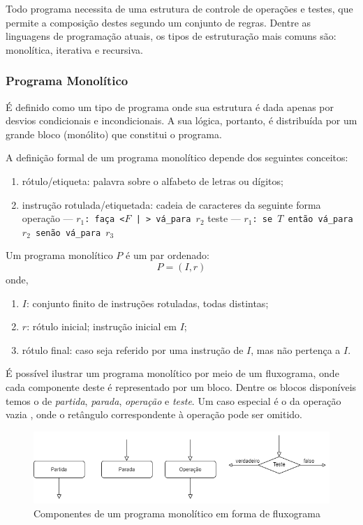 \documentclass[12pt,fleqn]{article}
\begin{document}
Todo programa necessita de uma estrutura de controle de operações e testes, que
permite a composição destes segundo um conjunto de regras. Dentre as linguagens
de programação atuais, os tipos de estruturação mais comuns são: monolítica,
iterativa e recursiva.

\subsubsection{Programa Monolítico}
É definido como um tipo de programa onde sua estrutura é dada apenas por
desvios condicionais e incondicionais. A sua lógica, portanto, é distribuída
por um grande bloco (monólito) que constitui o programa.

A definição formal de um programa monolítico depende dos seguintes conceitos:

\begin{enumerate}
    \item rótulo/etiqueta: palavra sobre o alfabeto de letras ou dígitos;
    \item instrução rotulada/etiquetada: cadeia de caracteres da seguinte forma
        \subitem operação --- \texttt{$r_1$: faça <$F$ | \checkmark>
        vá\_para
        $r_2$}
        \subitem \hspace{1.5em} teste --- \texttt{$r_1$: se $T$ então vá\_para
        $r_2$ senão vá\_para $r_3$}
\end{enumerate}

\noindent
Um programa monolítico $P$ é um par ordenado:
\[
    P = (I, r)
\]
onde,

\begin{enumerate}
    \item $I$: conjunto finito de instruções rotuladas, todas distintas;
    \item $r$: rótulo inicial; instrução inicial em $I$;
    \item rótulo final: caso seja referido por uma instrução de $I$, mas não
    pertença a $I$.
\end{enumerate}

É possível ilustrar um programa monolítico por meio de um fluxograma, onde cada
componente deste é representado por um bloco. Dentre os blocos disponíveis
temos o de \textit{partida}, \textit{parada}, \textit{operação} e
\textit{teste}. Um caso especial é o da operação vazia \checkmark, onde o
retângulo correspondente à operação pode ser omitido.

\begin{figure}[H]
    \includegraphics[width=\linewidth]{img/monolitico}
    \caption{Componentes de um programa monolítico em forma de fluxograma}
\end{figure}
\end{document}
